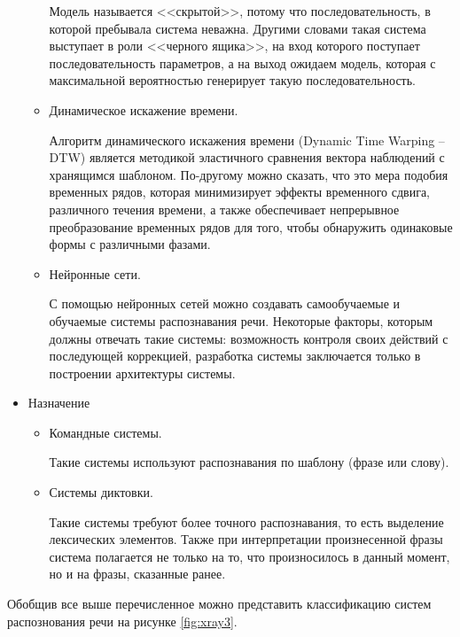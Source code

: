 \begin{itemize}
\begin{itemize}
		Модель называется <<скрытой>>, потому что последовательность, в которой пребывала система неважна. Другими словами такая система выступает в роли <<черного ящика>>, на вход которого поступает последовательность параметров, а на выход ожидаем модель, которая с максимальной вероятностью генерирует такую последовательность.
		
		\item Динамическое искажение времени.
		
		Алгоритм динамического искажения времени (Dynamic Time \newline Warping – DTW) является методикой эластичного сравнения вектора наблюдений с хранящимся шаблоном. По-другому можно сказать, что это мера подобия временных рядов, которая минимизирует эффекты временного сдвига, различного течения времени, а также обеспечивает непрерывное преобразование временных рядов для того, чтобы обнаружить одинаковые формы с различными фазами.
		
		\item Нейронные сети.
		
		С помощью нейронных сетей можно создавать самообучаемые и обучаемые системы распознавания речи. Некоторые факторы, которым должны отвечать такие системы: возможность контроля своих действий с последующей коррекцией, разработка системы заключается только в построении архитектуры системы.
		
	\end{itemize}
	
	\item Назначение
	\begin{itemize}
		\item Командные системы.
		
		Такие системы используют распознавания по шаблону (фразе или слову).
		
		\item Системы диктовки.
		
		Такие системы требуют более точного распознавания, то есть выделение лексических элементов. Также при интерпретации произнесенной фразы система полагается не только на то, что произносилось в данный момент, но и на фразы, сказанные ранее.
		
	\end{itemize}
\end{itemize}

Обобщив все выше перечисленное можно представить классификацию систем распознования речи на рисунке \ref{fig:xray3}.


